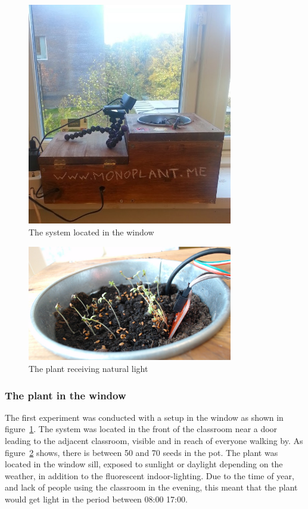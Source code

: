 \begin{figure}
\centering
\includegraphics[width=0.8\textwidth]{img/empiricalsetting/window.jpg}
\caption{The system located in the window}
\label{fig:windowplant}
\end{figure}

\begin{figure}
\centering
\includegraphics[width=0.8\textwidth]{img/empiricalsetting/windowsystem.jpg}
\caption{The plant receiving natural light}
\label{fig:windowsystemplant}
\end{figure}

\subsubsection*{The plant in the window}
The first experiment was conducted with a setup in the window as shown in figure~\ref{fig:windowplant}. The system was located in the front of the classroom near a door leading to the adjacent classroom, visible and in reach of everyone walking by. As figure~\ref{fig:windowsystemplant} shows, there is between 50 and 70 seeds in the pot. The plant was located in the window sill, exposed to sunlight or daylight depending on the weather, in addition to the fluorescent indoor-lighting. Due to the time of year, and lack of people using the classroom in the evening, this meant that the plant would get light in the period between 08:00 17:00.

